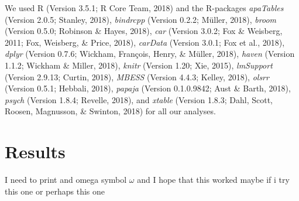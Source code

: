 \documentclass[man,floatsintext]{apa6}
\begin{document}
We used R (Version 3.5.1; R Core Team, 2018) and the R-packages
\emph{apaTables} (Version 2.0.5; Stanley, 2018), \emph{bindrcpp}
(Version 0.2.2; Müller, 2018), \emph{broom} (Version 0.5.0; Robinson \&
Hayes, 2018), \emph{car} (Version 3.0.2; Fox \& Weisberg, 2011; Fox,
Weisberg, \& Price, 2018), \emph{carData} (Version 3.0.1; Fox et al.,
2018), \emph{dplyr} (Version 0.7.6; Wickham, François, Henry, \& Müller,
2018), \emph{haven} (Version 1.1.2; Wickham \& Miller, 2018),
\emph{knitr} (Version 1.20; Xie, 2015), \emph{lmSupport} (Version
2.9.13; Curtin, 2018), \emph{MBESS} (Version 4.4.3; Kelley, 2018),
\emph{olsrr} (Version 0.5.1; Hebbali, 2018), \emph{papaja} (Version
0.1.0.9842; Aust \& Barth, 2018), \emph{psych} (Version 1.8.4; Revelle,
2018), and \emph{xtable} (Version 1.8.3; Dahl, Scott, Roosen, Magnusson,
\& Swinton, 2018) for all our analyses.

\section{Results}\label{results}

I need to print and omega symbol \(\omega\) and I hope that this worked
maybe if i try this one or perhaps this one
\end{document}
